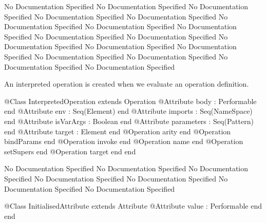 No Documentation Specified
No Documentation Specified
No Documentation Specified
No Documentation Specified
No Documentation Specified
No Documentation Specified
No Documentation Specified
No Documentation Specified
No Documentation Specified
No Documentation Specified
No Documentation Specified
No Documentation Specified
No Documentation Specified
No Documentation Specified
No Documentation Specified
No Documentation Specified
No Documentation Specified

      An interpreted operation is created when we evaluate an operation definition.
\begin{Interface}
@Class InterpretedOperation extends Operation
  @Attribute body : Performable end
  @Attribute env : Seq(Element) end
  @Attribute imports : Seq(NameSpace) end
  @Attribute isVarArgs : Boolean end
  @Attribute parameters : Seq(Pattern) end
  @Attribute target : Element end
  @Operation arity end
  @Operation bindParams end
  @Operation invoke end
  @Operation name end
  @Operation setSupers end
  @Operation target end
end
\end{Interface}
No Documentation Specified
No Documentation Specified
No Documentation Specified
No Documentation Specified
No Documentation Specified
No Documentation Specified
No Documentation Specified
\begin{Interface}
@Class InitialisedAttribute extends Attribute
  @Attribute value : Performable end
end
\end{Interface}

